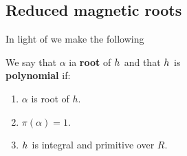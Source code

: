 \documentclass[../main.tex]{subfiles}
\begin{document}
  \subsection{Reduced magnetic roots}
  In light of  we make the following
  \begin{definition}
    \label{def:aredex}
    We say that $\alpha$ ia \textbf{\aredex root} of $h_{}$ and that $h_{}$ is \\ \textbf{\aredex polynomial} if:
    \begin{enumerate}
      \item $\alpha$ is \anex root of $h$.
      \item $\pi\left( \alpha \right) = 1$. 
      \item $h_{}$ is integral and primitive over $R$.
    \end{enumerate}
  \end{definition} 
  
\end{document}
